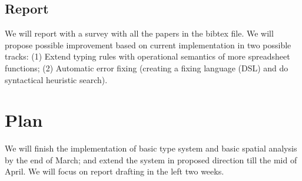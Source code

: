 \documentclass[a4paper]{article}
\begin{document}
\subsection{Report}
We will report with a survey with all the papers in the bibtex file. We will propose possible improvement based on current implementation in two possible tracks: (1) Extend typing rules with operational semantics of more spreadsheet functions; (2) Automatic error fixing (creating a fixing language (DSL) and do syntactical heuristic search).

\section{Plan}
We will finish the implementation of basic type system and basic spatial analysis by the end of March; and extend the system in proposed direction till the mid of April.
We will focus on report drafting in the left two weeks.



\end{document}
